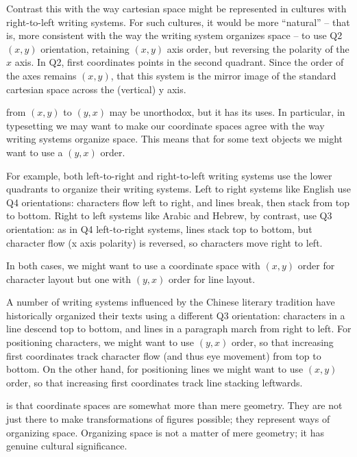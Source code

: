 \documentclass[12pt]{tufte-handout}
\numberwithin{equation}{subsection}
\numberwithin{equation}{subsection}
\newcommand\cspace{coordinate space}
\begin{document}
  Contrast this with the way cartesian space might be represented in
  cultures with right-to-left writing systems.  For such cultures, it
  would be more ``natural'' -- that is, more consistent with the way the
  writing system organizes space -- to use Q2 \((x,y)\) orientation,
  retaining \((x,y)\) axis order, but reversing the polarity of the
  \(x\) axis.  In Q2, first coordinates%
  points in the second quadrant.  Since the order of the axes remains
  \((x,y)\), that this system is the mirror image of the standard
  cartesian space across the (vertical) y axis.

   from \((x,y)\) to \((y,x)\) may
  be unorthodox, but it has its uses.  In particular, in typesetting we
  may want to make our \cspace{}s agree with the way writing systems
  organize space.  This means that for some text objects we might want
  to use a \((y,x)\) order.

  For example, both left-to-right and right-to-left writing systems use
  the lower quadrants to organize their writing systems.  Left to right
  systems like English use Q4 orientations: characters flow left to
  right, and lines break, then stack from top to bottom.  Right to left
  systems like Arabic and Hebrew, by contrast, use Q3 orientation: as in
  Q4 left-to-right systems, lines stack top to bottom, but character
  flow (x axis polarity) is reversed, so characters move right to left.

  In both cases, we might want to use a \cspace{} with \((x,y)\) order
  for character layout but one with \((y,x)\) order for line
  layout.

  A number of writing systems influenced by the Chinese literary
  tradition have historically organized their texts using a different Q3
  orientation: characters in a line descend top to bottom, and lines in
  a paragraph march from right to left.  For positioning characters, we
  might want to use \((y,x)\) order, so that increasing first
  coordinates track character flow (and thus eye movement) from top to
  bottom.  On the other hand, for positioning lines we might want to use
  \((x,y)\) order, so that increasing first coordinates track line
  stacking leftwards.

   is that \cspace{}s are somewhat
  more than mere geometry.  They are not just there to make
  transformations of figures possible; they represent ways of organizing
  space.  Organizing space is not a matter of mere geometry; it has
  genuine cultural significance.
\end{document}
